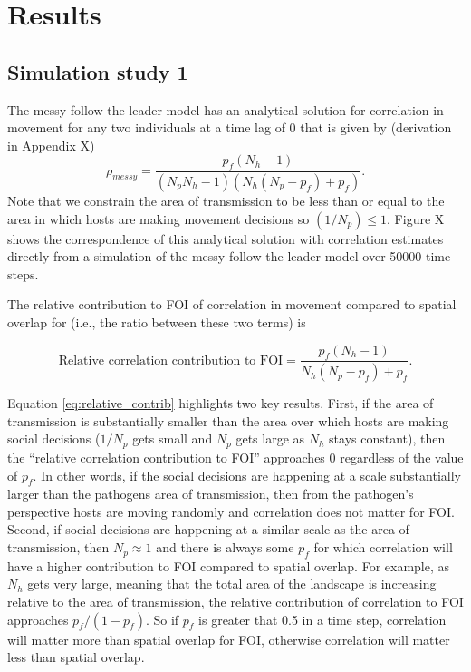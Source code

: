 \documentclass[letterpaper]{article}
\begin{document}
\section*{Results}

\subsection*{Simulation study 1}

The messy follow-the-leader model has an analytical solution for correlation in movement for any two individuals at a time lag of 0 that is given by (derivation in Appendix X)
\begin{equation}
    \rho_{messy} = \frac{p_f(N_h - 1)}{(N_p N_h - 1)(N_h(N_p - p_f) + p_f)}.
    \label{eq:messy_leader}
\end{equation}
Note that we constrain the area of transmission to be less than or equal to the area in which hosts are making movement decisions so $(1 / N_p) \leq 1$. Figure X shows the correspondence of this analytical solution with correlation estimates directly from a simulation of the messy follow-the-leader model over 50000 time steps.

The relative contribution to FOI of correlation in movement compared to spatial overlap for (i.e., the ratio between these two terms) is

\begin{equation}
    \text{Relative correlation contribution to FOI} = \frac{p_f(N_h - 1)}{N_h(N_p - p_f) + p_f}.
    \label{eq:relative_contrib}
\end{equation}

Equation \ref{eq:relative_contrib} highlights two key results.  First, if the area of transmission is substantially smaller than the area over which hosts are making social decisions ($1 / N_p$ gets small and $N_p$ gets large as $N_h$ stays constant), then the ``relative correlation contribution to FOI'' approaches 0 regardless of the value of $p_f$. In other words, if the social decisions are happening at a scale substantially larger than the pathogens area of transmission, then from the pathogen's perspective hosts are moving randomly and correlation does not matter for FOI.
Second, if social decisions are happening at a similar scale as the area of transmission, then $N_p \approx 1$ and there is always some $p_f$ for which correlation will have a higher contribution to FOI compared to spatial overlap.  For example, as $N_h$ gets very large, meaning that the total area of the landscape is increasing relative to the area of transmission, the relative contribution of correlation to FOI approaches $p_f / (1 - p_f)$. So if $p_f$ is greater that 0.5 in a time step, correlation will matter more than spatial overlap for FOI, otherwise correlation will matter less than spatial overlap.  
\end{document}

